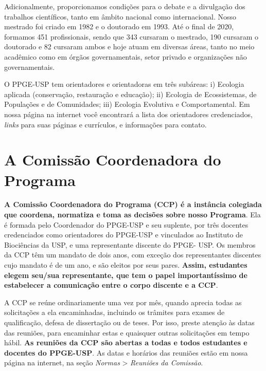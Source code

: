 Adicionalmente, proporcionamos condições para o debate e a divulgação
dos trabalhos científicos, tanto em âmbito nacional como internacional.
Nosso mestrado foi criado em 1982 e o doutorado em 1993. Até o final de
2020, formamos 451 profissionais, sendo que 343 cursaram o mestrado, 190
cursaram o doutorado e 82 cursaram ambos e hoje atuam em diversas áreas,
tanto no meio acadêmico como em órgãos governamentais, setor privado e
organizações não governamentais.

O PPGE-USP tem orientadores e orientadoras em três subáreas: i)
Ecologia aplicada (conservação, restauração e educação); ii) Ecologia
de Ecossistemas, de Populações e de Comunidades; iii) Ecologia
Evolutiva e Comportamental.  Em nossa página na internet você
encontrará a lista dos orientadores credenciados, \emph{links} para
suas páginas e currículos, e informações para contato.


\section{A Comissão Coordenadora do Programa}
\label{sec:CCP}

\textbf{A Comissão Coordenadora do Programa (CCP) é a instância
colegiada que coordena, normatiza e toma as decisões sobre nosso
Programa}. Ela é formada pelo Coordenador do PPGE-USP e seu suplente,
por três docentes credenciados como orientadores do PPGE-USP e
vinculados ao Instituto de Biociências da USP, e uma representante
discente do PPGE- USP. Os membros da CCP têm um mandato de dois anos,
com exceção dos representantes discentes cujo mandato é de um ano, e são
eleitos por seus pares. \textbf{Assim, estudantes elegem seu/sua
representante, que tem o papel importantíssimo de estabelecer a
comunicação entre o corpo discente e a CCP}.

A CCP se reúne ordinariamente uma vez por mês, quando aprecia todas as
solicitações a ela encaminhadas, incluindo os trâmites para exames de
qualificação, defesa de dissertação ou de teses. Por isso, preste atenção
às datas das reuniões, para encaminhar estas e quaisquer outras
solicitações em tempo hábil. \textbf{As reuniões da CCP são abertas a
todas e todos estudantes e docentes do PPGE-USP}. As datas e horários
das reuniões estão em nossa página na internet, na seção \emph{Normas}
\textgreater{} \emph{Reuniões da Comissão}.


